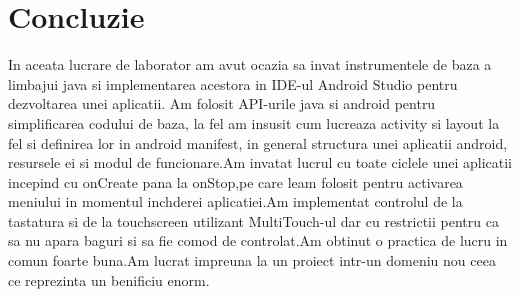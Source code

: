 \section*{Concluzie}


In aceata lucrare de laborator am avut ocazia sa invat instrumentele de baza a limbajui java si implementarea acestora in IDE-ul Android Studio pentru dezvoltarea unei aplicatii. Am folosit API-urile java si android pentru simplificarea codului de baza, la fel am insusit cum lucreaza activity si layout la fel si definirea lor in android manifest, in general structura unei aplicatii android, resursele ei si modul de funcionare.Am invatat lucrul cu toate ciclele unei  aplicatii incepind cu onCreate pana la onStop,pe care leam folosit pentru activarea meniului in momentul inchderei aplicatiei.Am implementat controlul de la tastatura si de la touchscreen utilizant MultiTouch-ul dar cu restrictii pentru ca sa nu apara baguri si sa fie comod de controlat.Am obtinut o practica de lucru in comun foarte buna.Am lucrat impreuna la un proiect intr-un domeniu nou ceea ce reprezinta un benificiu enorm. 

\clearpage